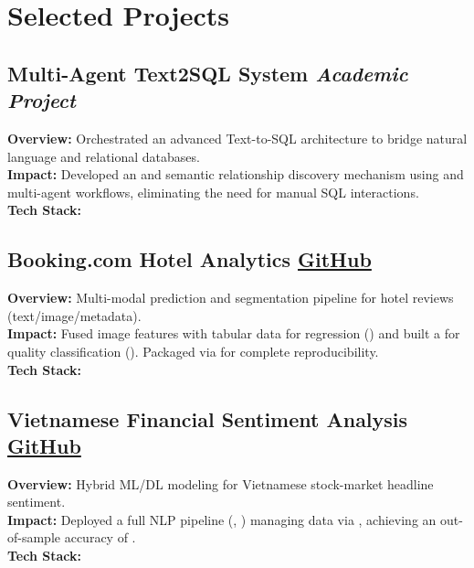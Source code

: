 \section{Selected Projects}
\subsection*{Multi-Agent Text2SQL System \hfill \small\textit{Academic Project}}
\textbf{Overview:} Orchestrated an advanced Text-to-SQL architecture to bridge natural language and relational databases.\\[0.05cm]
\textbf{Impact:} Developed an  and semantic relationship discovery mechanism using  and multi-agent workflows, eliminating the need for manual SQL interactions.\\[0.05cm]
\textbf{Tech Stack:}    
\vspace{0.2cm}

\subsection*{Booking.com Hotel Analytics \hfill \small\href{https://github.com/khang3004/Comprehensive-ML-DL-Approaches-for-Hotel-Room-Review-Score-Prediction}{GitHub}}
\textbf{Overview:} Multi-modal prediction and segmentation pipeline for hotel reviews (text/image/metadata).\\[0.05cm]
\textbf{Impact:} Fused  image features with tabular data for regression () and built a  for quality classification (). Packaged via  for complete reproducibility.\\[0.05cm]
\textbf{Tech Stack:}    
\vspace{0.2cm}

\subsection*{Vietnamese Financial Sentiment Analysis \hfill \small\href{https://github.com/khang3004/FINANCIAL-SENTIMENT-ANALYSIS-onVietnamese-Stock-Market-Headlines}{GitHub}}
\textbf{Overview:} Hybrid ML/DL modeling for Vietnamese stock-market headline sentiment.\\[0.05cm]
\textbf{Impact:} Deployed a full NLP pipeline (, ) managing data via , achieving an out-of-sample accuracy of .\\[0.05cm]
\textbf{Tech Stack:}    
